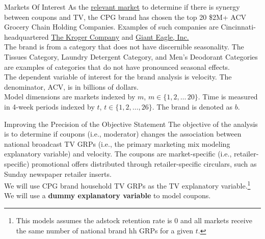 \documentclass[pdf]{beamer}
\newcommand{\empr}[1]{{\color{franklinblue}\textbf{#1}}}
\theoremstyle{remark}
\theoremstyle{definition}
\begin{document}
\begin{frame}[t]{Markets Of Interest}
As the \underline{relevant market} to determine if there is synergy between coupons and TV, the CPG brand has chosen the top 20 \$2M+ ACV Grocery Chain Holding Companies.  Examples of such companies are Cincinnati-headquartered \href{https://www.thekrogerco.com/about-kroger/our-business/}{The Kroger Company} and \href{https://www.gianteagle.com/about-us/our-brands}{Giant Eagle, Inc.}  \\
\vspace{1.5ex}
The brand is from a category that does not have discernible seasonality. The Tissues Category, Laundry Detergent Category, and Men's Deodorant Categories are examples of categories that do not have pronounced seasonal effects. \\
\vspace{1.5ex}
The dependent variable of interest for the brand analysis is velocity.  The denominator, ACV, is in billions of dollars.  \\
\vspace{1.5ex}
Model dimensions are markets indexed by $m$, $m \in \{1,2,\ldots\,20\}.$ Time is measured in 4-week periods indexed by $t$, $t \in \{1,2,\ldots,26\}$.  The brand is denoted as $b$.
\end{frame}

\begin{frame}[t]{Improving the Precision of the Objective Statement}
The objective of the analysis is to determine if coupons (i.e., moderator) changes the association between national broadcast TV GRPs (i.e., the primary marketing mix modeling explanatory variable) and velocity. The coupons are market-specific (i.e., retailer-specific) promotional offers distributed through retailer-specific circulars, such as Sunday newspaper retailer inserts.  \\
\vspace{1.5ex}
We will use CPG brand household TV GRPs as the TV explanatory variable.\footnote{This models assumes the adstock retention rate is 0 and all markets receive the same number of national brand hh GRPs for a given $t$.} \\
\vspace{1.5ex}
We will use a \empr{dummy explanatory variable} to model coupons. 
\end{frame}
\end{document}
